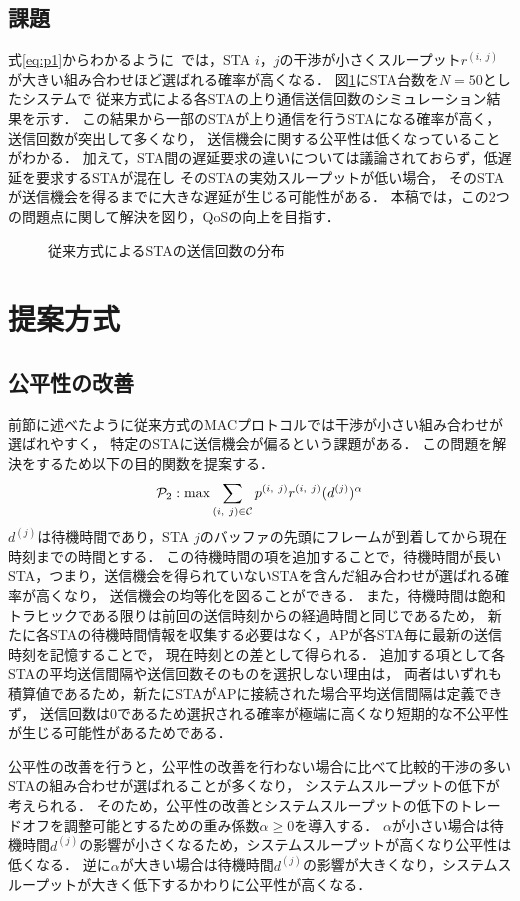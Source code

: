 \documentclass[twocolumn, a4paper]{ieicejsp}
\newcommand{\sij}{(i,\ j)}
\newcommand{\rij}{r^{\sij}}
\begin{document}
	\subsection{課題}
		式\eqref{eq:p1}からわかるように~\cite{promac}では，STA $i$，$j$の干渉が小さくスループット$\rij$が大きい組み合わせほど選ばれる確率が高くなる．
		図\ref{fig:numtx}にSTA台数を$N=50$としたシステムで
		従来方式による各STAの上り通信送信回数のシミュレーション結果を示す．
		この結果から一部のSTAが上り通信を行うSTAになる確率が高く，送信回数が突出して多くなり，
		送信機会に関する公平性は低くなっていることがわかる．
		加えて，STA間の遅延要求の違いについては議論されておらず，低遅延を要求するSTAが混在し
		そのSTAの実効スループットが低い場合，
		そのSTAが送信機会を得るまでに大きな遅延が生じる可能性がある．
		本稿では，この2つの問題点に関して解決を図り，QoSの向上を目指す．

		\begin{figure}[t]
			\centering
			\caption{従来方式によるSTAの送信回数の分布}
			\label{fig:numtx}
		\end{figure}

\section{提案方式}
	\subsection{公平性の改善}\label{sec:fair}
		前節に述べたように従来方式のMACプロトコルでは干渉が小さい組み合わせが選ばれやすく，
		特定のSTAに送信機会が偏るという課題がある．
		この問題を解決をするため以下の目的関数を提案する．
		\begin{equation}
			{\mathcal P}_2: {\rm max} \sum_{(i,\ j)\in{\mathcal C}} p^{(i,\ j)}r^{(i,\ j)}(d^{(j)})^{\alpha} \label{eq:p2}
		\end{equation}
		$d^{(j)}$は待機時間であり，STA $j$のバッファの先頭にフレームが到着してから現在時刻までの時間とする．
		この待機時間の項を追加することで，待機時間が長いSTA，つまり，送信機会を得られていないSTAを含んだ組み合わせが選ばれる確率が高くなり，
		送信機会の均等化を図ることができる．
		また，待機時間は飽和トラヒックである限りは前回の送信時刻からの経過時間と同じであるため，
		新たに各STAの待機時間情報を収集する必要はなく，APが各STA毎に最新の送信時刻を記憶することで，
		現在時刻との差として得られる．
		追加する項として各STAの平均送信間隔や送信回数そのものを選択しない理由は，
		両者はいずれも積算値であるため，新たにSTAがAPに接続された場合平均送信間隔は定義できず，
		送信回数は0であるため選択される確率が極端に高くなり短期的な不公平性が生じる可能性があるためである．
		\par
		公平性の改善を行うと，公平性の改善を行わない場合に比べて比較的干渉の多いSTAの組み合わせが選ばれることが多くなり，
		システムスループットの低下が考えられる．
		そのため，公平性の改善とシステムスループットの低下のトレードオフを調整可能とするための重み係数$\alpha\geq 0$を導入する．
		$\alpha$が小さい場合は待機時間$d^{(j)}$の影響が小さくなるため，システムスループットが高くなり公平性は低くなる．
		逆に$\alpha$が大きい場合は待機時間$d^{(j)}$の影響が大きくなり，システムスループットが大きく低下するかわりに公平性が高くなる．
\end{document}
